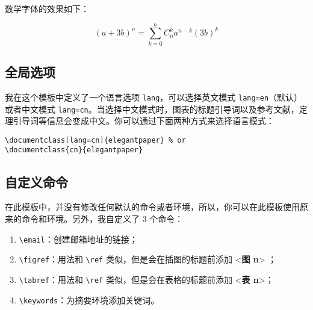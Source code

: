 \documentclass[lang=cn,11pt]{elegantpaper}
\begin{document}
数学字体的效果如下：

\begin{equation}
(a+3b)^{n} = \sum_{k=0}^{n} C_{n}^{k} a^{n-k} (3b)^k\label{eq:binom}
\end{equation}

\subsection{全局选项}
我在这个模板中定义了一个语言选项 \lstinline{lang}，可以选择英文模式 \lstinline{lang=en}（默认）或者中文模式 \lstinline{lang=cn}。当选择中文模式时，图表的标题引导词以及参考文献，定理引导词等信息会变成中文。你可以通过下面两种方式来选择语言模式：

\begin{lstlisting}
\documentclass[lang=cn]{elegantpaper} % or
\documentclass{cn}{elegantpaper}
\end{lstlisting}


\subsection{自定义命令}
在此模板中，并没有修改任何默认的命令或者环境，所以，你可以在此模板使用原来的命令和环境。另外，我自定义了 3 个命令：

\begin{enumerate}
	\item \lstinline{\email}：创建邮箱地址的链接；
	\item \lstinline{\figref}：用法和 \lstinline{\ref} 类似，但是会在插图的标题前添加 <\textbf{图 n}> ；
	\item \lstinline{\tabref}：用法和 \lstinline{\ref} 类似，但是会在表格的标题前添加 <\textbf{表 n}>；
	\item \lstinline{\keywords}：为摘要环境添加关键词。
\end{enumerate}
\end{document}
